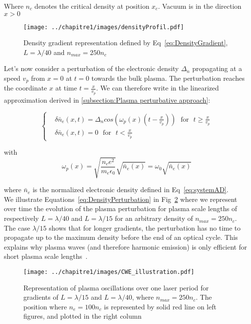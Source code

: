 \noindent Where $n_c$ denotes the critical density at position $x_c$. Vacuum is in the direction $x>0$


\begin{figure}[H]
\centering
\texttt{[image: ../chapitre1/images/densityProfil.pdf]}\\
\caption{\label{fig:Density Gradient}Density gradient representation defined by Eq~\ref{eq:DensityGradient}, $L = \lambda / 40$ and $n_{max} = 250n_c$}
\end{figure}



\noindent Let's now consider a perturbation of the electronic density $\Delta_n$ propagating at a speed $v_p$ from $x = 0$ at $t = 0$ towards the bulk plasma. The perturbation reaches the coordinate $x$ at time $t = \frac{x}{v_p}$. We can therefore write in the linearized approximation derived in \ref{subsection:Plasma perturbative approach}:

\begin{equation}
  \left\{
      \begin{aligned}
&\delta\bar{n}_e(x,t) = \Delta_n cos(\omega_p(x) (t-\frac{x}{v_p})) \ \ \  \mbox{for} \ \ \  t \ge \frac{x}{v_p}\\
&\delta \bar{n}_e(x,t) = 0 \ \ \ \mbox{for} \ \ \  t < \frac{x}{v_p}
      \end{aligned}
    \right.
\label{eq:DensityPerturbation}
\end{equation}

\noindent with 
$$
\omega_p(x) = \sqrt{\frac{n_{c}e^2}{m_e\epsilon_0}} \sqrt{\bar{n}_e(x)}= \omega_0 \sqrt{\bar{n}_e(x)}
$$

\noindent where $\bar{n}_e$ is the normalized electronic density defined in Eq~\ref{eq:systemAD}.\\

\noindent We illustrate Equations~\ref{eq:DensityPerturbation} in Fig~\ref{fig:CWE_illustration} where we represent over time the evolution of the plasma perturbation for plasma scale lengths of respectively $L = \lambda/40$ and $L=\lambda/15$ for an arbitrary density of $n_{max} = 250 n_{c}$. The case $\lambda/15$ shows that for longer gradients, the perturbation has no time to propagate up to the maximum density before the end of an optical cycle. This explains why plasma waves (and therefore harmonic emission) is only efficient for short plasma scale lengths~\cite{thaury2010high,TheseCedric,theseAnto,TheseArnaud}.

\begin{figure}[H]
\centering
\texttt{[image: ../chapitre1/images/CWE\_illustration.pdf]}\\
\caption{\label{fig:CWE_illustration} Representation of plasma oscillations over one laser period for gradients of $L = \lambda/15$ and $L = \lambda/40$, where $n_{max} = 250n_c$. The position where $n_e = 100 n_c$ is represented by solid red line on left figures, and plotted in the right column}
\end{figure}


